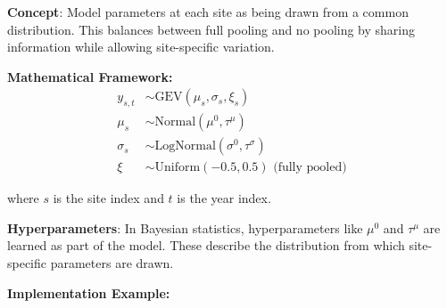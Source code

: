 \documentclass[
  letterpaper,
  DIV=11,
  numbers=noendperiod]{scrreprt}
\begin{document}
\textbf{Concept}: Model parameters at each site as being drawn from a
common distribution. This balances between full pooling and no pooling
by sharing information while allowing site-specific variation.

\textbf{Mathematical Framework:} \[
\begin{aligned}
    y_{s,t} &\sim \text{GEV}(\mu_s, \sigma_s, \xi_s) \\
    \mu_s &\sim \text{Normal}(\mu^0, \tau^\mu) \\
    \sigma_s &\sim \text{LogNormal}(\sigma^0, \tau^\sigma) \\
    \xi &\sim \text{Uniform}(-0.5, 0.5) \text{ (fully pooled)}
\end{aligned}
\]

where \(s\) is the site index and \(t\) is the year index.

\textbf{Hyperparameters}: In Bayesian statistics, hyperparameters like
\(\mu^0\) and \(\tau^\mu\) are learned as part of the model. These
describe the distribution from which site-specific parameters are drawn.

\textbf{Implementation Example:}
\end{document}
